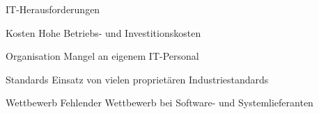
\begin{frame}{IT-Herausforderungen}
  \begin{block}{Kosten}
    Hohe Betriebs- und Investitionskosten
  \end{block}

  \begin{block}{Organisation}
    Mangel an eigenem IT-Personal
  \end{block}

  \begin{block}{Standards}
    Einsatz von vielen proprietären Industriestandards
  \end{block}

  \begin{block}{Wettbewerb}
    Fehlender Wettbewerb bei Software- und Systemlieferanten
  \end{block}
\end{frame}

